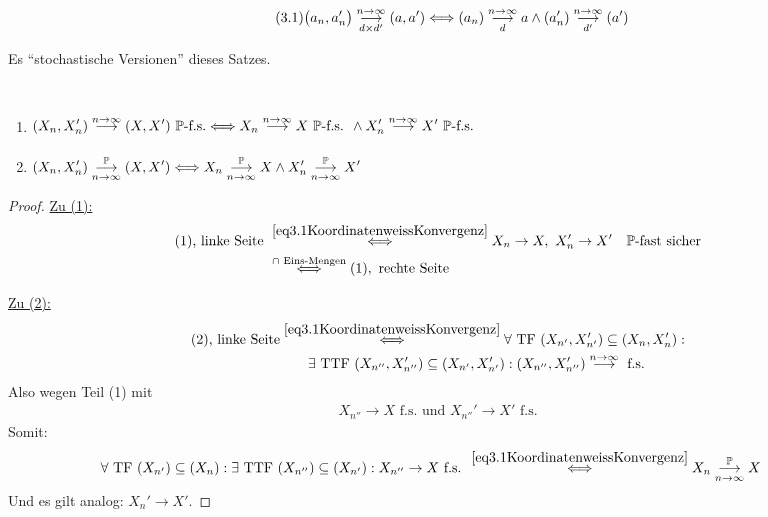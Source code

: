 \begin{align}\label{eq3.1KoordinatenweissKonvergenz}\tag{3.1}
	\big(a_n,a_n'\big)
	\stackrelnew{d\times d'}{n\to\infty}{\longrightarrow}
	(a,a')
	\Longleftrightarrow
	(a_n)
	\stackrelnew{d}{n\to\infty}{\longrightarrow}
	a
	\wedge
	(a_n')
	\stackrelnew{d'}{n\to\infty}{\longrightarrow}
	(a')
\end{align}

Es ``stochastische Versionen'' dieses Satzes.

\begin{satz}\label{satz3.15}\
	\begin{enumerate}[label=(\arabic*)]
		\item $\begin{aligned}
			(X_n,X_n')
			\stackrelnew{}{n\to\infty}{\longrightarrow}
			(X,X')~\P\text{-f.s.}
			\Longleftrightarrow
			X_n
			\stackrelnew{}{n\to\infty}{\longrightarrow}
			X~\P\text{-f.s. }\wedge
			X_n'
			\stackrelnew{}{n\to\infty}{\longrightarrow}
			X'~\P\text{-f.s.}
		\end{aligned}$
		\item $\begin{aligned}
			(X_n,X_n')
			\stackrelnew{n\to\infty}{\P}{\longrightarrow}
			(X,X')
			\Longleftrightarrow
			X_n
			\stackrelnew{n\to\infty}{\P}{\longrightarrow}
			X\wedge
			X_n'
			\stackrelnew{n\to\infty}{\P}{\longrightarrow}
			X'
		\end{aligned}$
	\end{enumerate}
\end{satz}

\begin{proof}
	\underline{Zu (1):}
	\begin{align*}
		(1)\text{, linke Seite }
		&\stackrel{\eqref{eq3.1KoordinatenweissKonvergenz}}{\Longleftrightarrow}
		X_n\to X,~X_n'\to X'\quad\P\text{-fast sicher}\\
		&\stackrel{\cap\text{ Eins-Mengen}}{\Longleftrightarrow}
		(1),\text{ rechte Seite}
	\end{align*}

	\underline{Zu (2):}
	\begin{align*}
		(2)\text{, linke Seite}
		&\stackrel{\eqref{eq3.1KoordinatenweissKonvergenz}}{\Longleftrightarrow}
		\forall\text{ TF }(X_{n'},X_{n'}')\subseteq(X_n,X_n'):\\
		&\qquad\exists\text{ TTF }(X_{n''},X_{n''}')\subseteq(X_{n'},X_{n'}'):
		(X_{n''},X_{n''}')\stackrel{n\to\infty}{\longrightarrow}\text{ f.s.}
	\end{align*}
	Also wegen Teil (1) mit
	\begin{align*}
		X_{n''}\to X\text{ f.s. und }X_{n''}'\to X'\text{ f.s.}
	\end{align*}
	Somit:
	\begin{align*}
		\forall\text{ TF }(X_{n'})\subseteq(X_n):\exists\text{ TTF }(X_{n''})\subseteq(X_{n'}):X_{n''}\to X\text{ f.s. }
		&\stackrel{\eqref{eq3.1KoordinatenweissKonvergenz}}{\Longleftrightarrow}
		X_n\stackrelnew{n\to\infty}{\P}{\longrightarrow} X
	\end{align*}
	Und es gilt analog: $X_n'\to X'$.
\end{proof}

